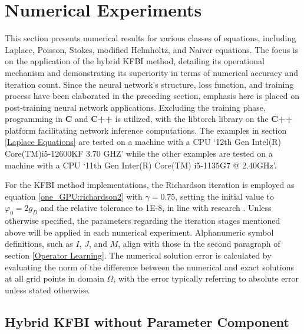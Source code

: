 \documentclass{article}
\begin{document}
\section{Numerical Experiments} \label{Numerical Experiments}
This section presents numerical results for various classes of equations, including Laplace, Poisson, Stokes, modified Helmholtz, and Naiver equations. The focus is on the application of the hybrid KFBI method, detailing its operational mechanism and demonstrating its superiority in terms of numerical accuracy and iteration count. Since the neural network's structure, loss function, and training process have been elaborated in the preceding section, emphasis here is placed on post-training neural network applications. Excluding the training phase, programming in \textbf{C} and \textbf{C++} is utilized, with the libtorch library on the \textbf{C++} platform facilitating network inference computations. The examples in section \ref{Laplace Equations} are tested on a machine with a CPU `12th Gen Intel(R) Core(TM)i5-12600KF 3.70 GHZ' while the other examples are tested on a machine with a CPU `11th Gen Inter(R) Core(TM) i5-1135G7 @ 2.40GHz'.

For the KFBI method implementations, the Richardson iteration is employed as equation \eqref{one_GPU:richardson2} with $\gamma = 0.75$, setting the initial value to $\varphi_0 = 2g_D$ and the relative tolerance to 1E-8, in line with research \cite{ying2007kernel}. Unless otherwise specified, the parameters regarding the iteration stages mentioned above will be applied in each numerical experiment. Alphanumeric symbol definitions, such as $I$, $J$, and $M$, align with those in the second paragraph of section \ref{Operator Learning}. The numerical solution error is calculated by evaluating the norm of the difference between the numerical and exact solutions at all grid points in domain $\Omega$, with the error typically referring to absolute error unless stated otherwise.

\subsection{Hybrid KFBI without Parameter Component} \label{Hybrid-KFBI without Parameter Component}
\end{document}
